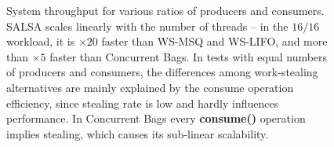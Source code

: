 \begin{figure}[htb]
	\centering
  \vspace{-10pt}
	\caption{\footnotesize{System throughput for various ratios of producers and consumers. SALSA scales linearly with the number of threads -- in the $16/16$ workload, it is $\times20$ faster than WS-MSQ and WS-LIFO, and more than $\times5$ faster than Concurrent Bags. In tests with equal numbers of producers and consumers, the differences among work-stealing alternatives are mainly explained by the consume operation efficiency, since stealing rate is low and hardly influences performance. In Concurrent Bags every {\bf consume()} operation implies stealing, which causes its sub-linear scalability.
}}
	\vspace{-5pt}
	\label{fig:throughput}
\end{figure}

